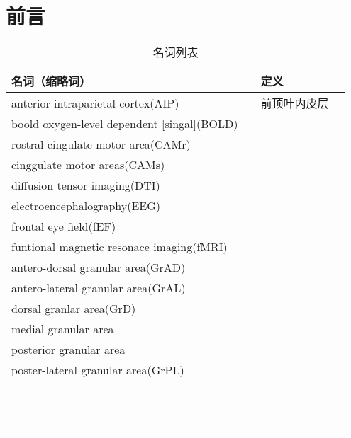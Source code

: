 \chapter{前言} \label{chap:preface}
\begin{table}[htbp]
	\newcommand{\tabincell}[2]{\begin{tabular}{@{}#1@{}}#2\end{tabular}} %
	\centering
	\caption{名词列表}
	\renewcommand\arraystretch{1.0}	%
	\begin{tabular}{llll}
		\toprule 
		 名词（缩略词）   && 定义 \\
		\midrule
		anterior intraparietal cortex(AIP)   &&前顶叶内皮层  \\
		\midrule
		boold oxygen-level dependent [singal](BOLD)     &&   \\
		\midrule
		rostral cingulate motor area(CAMr)     &&   \\
		\midrule
		cinggulate motor areas(CAMs)      &&   \\
		\midrule
		diffusion tensor imaging(DTI)       &&   \\
		\midrule
		electroencephalography(EEG)       &&   \\
		\midrule
		frontal eye field(fEF)       &&   \\
		\midrule
		funtional magnetic resonace imaging(fMRI)       &&   \\
		\midrule
		antero-dorsal granular area(GrAD)      &&   \\
        \midrule
        antero-lateral granular area(GrAL)       &&   \\
        \midrule
        dorsal granlar area(GrD)      &&   \\
        \midrule
        medial granular area       &&   \\
        \midrule
        posterior granular area       &&   \\
        \midrule
        poster-lateral granular area(GrPL)       &&   \\
        \midrule
               &&   \\
        \midrule
               &&   \\
        \midrule
               &&   \\
        \midrule
               &&   \\
        \midrule
               &&   \\
        \midrule
               &&   \\
       \midrule
              &&   \\
       \midrule
             &&   \\
       \midrule
       &       &&   \\
       \midrule
       &       &&   \\
       \midrule
       &       &&   \\
        \midrule
       &       &&   \\
		

\end{tabular}
\end{table}
